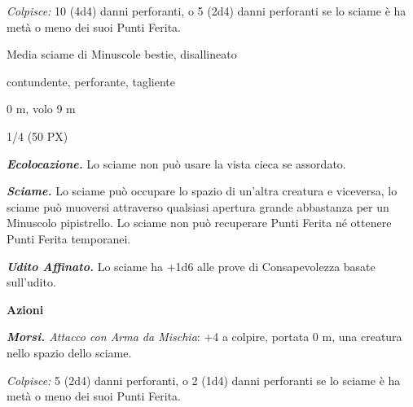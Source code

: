 \begin{multicols}{2}
{\emph{Colpisce:} 10 (4d4) danni perforanti, o 5 (2d4) danni perforanti se lo sciame è ha metà o meno dei suoi Punti Ferita.

\begin{description}[noitemsep, topsep=0pt, parsep=0pt, partopsep=0pt, itemsep=1pt, leftmargin=2.35cm,  labelwidth=2.2cm, itemindent=0cm, listparindent=0pt] %
\setlength{\baselineskip}{10pt}
\item[\textbf{Taglia/Tipo}] Media sciame di Minuscole bestie, disallineato
\item[\textbf{Caratt.}] 
\item[\textbf{Punti Ferita}] 
\item[\textbf{Resistenze al danno}] contundente, perforante, tagliente
\item[\textbf{Tiri Salvez.}] 
\item[\textbf{Movimento}] 0 m, volo 9 m
\item[\textbf{Sfida}] 1/4 (50 PX)
\end{description}
\smallskip

\emph{\textbf{Ecolocazione.}} Lo sciame non può usare la vista cieca se assordato.

\emph{\textbf{Sciame.}} Lo sciame può occupare lo spazio di un'altra creatura e viceversa, lo sciame può muoversi attraverso qualsiasi apertura grande abbastanza per un Minuscolo pipistrello. Lo sciame non può recuperare Punti Ferita né ottenere Punti Ferita temporanei.

\emph{\textbf{Udito Affinato.}} Lo sciame ha +1d6 alle prove di Consapevolezza basate sull'udito.

\textbf{Azioni}

\emph{\textbf{Morsi.} Attacco con Arma da Mischia}: +4 a colpire, portata 0 m, una creatura nello spazio dello sciame.

\emph{Colpisce:} 5 (2d4) danni perforanti, o 2 (1d4) danni perforanti se lo sciame è ha metà o meno dei suoi Punti Ferita.

}
\end{multicols}
